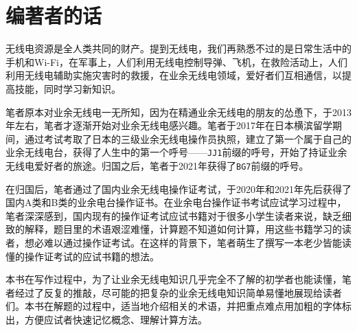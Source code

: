 \chapter*{编著者的话}

无线电资源是全人类共同的财产。提到无线电，我们再熟悉不过的是日常生活中的手机和Wi-Fi，在军事上，人们利用无线电控制导弹、飞机，在救险活动上，人们利用无线电辅助实施灾害时的救援，在业余无线电领域，爱好者们互相通信，以提高技能，同时学习新知识。

笔者原本对业余无线电一无所知，因为在精通业余无线电的朋友的怂恿下，于2013年左右，笔者才逐渐开始对业余无线电感兴趣。笔者于2017年在日本横滨留学期间，通过考试考取了日本的三级业余无线电操作员执照，建立了第一个属于自己的业余无线电台，获得了人生中的第一个呼号——\texttt{JJ1}前缀的呼号，开始了持证业余无线电爱好者的旅途。归国之后，笔者于2021年获得了\texttt{BG7}前缀的呼号。

在归国后，笔者通过了国内业余无线电操作证考试，于2020年和2021年先后获得了国内A类和B类的业余电台操作证书。在业余电台操作证书考试应试学习过程中，笔者深深感到，国内现有的操作证考试应试书籍对于很多小学生读者来说，缺乏细致的解释，题目里的术语艰涩难懂，计算题不知道如何计算，用这些书籍学习的读者，想必难以通过操作证考试。在这样的背景下，笔者萌生了撰写一本老少皆能读懂的操作证考试的应试书籍的想法。

本书在写作过程中，为了让业余无线电知识几乎完全不了解的初学者也能读懂，笔者经过了反复的推敲，尽可能的把复杂的业余无线电知识简单易懂地展现给读者们。本书在解题的过程中，适当地介绍相关的术语，并把重点难点用加粗的字体标出，方便应试者快速记忆概念、理解计算方法。


